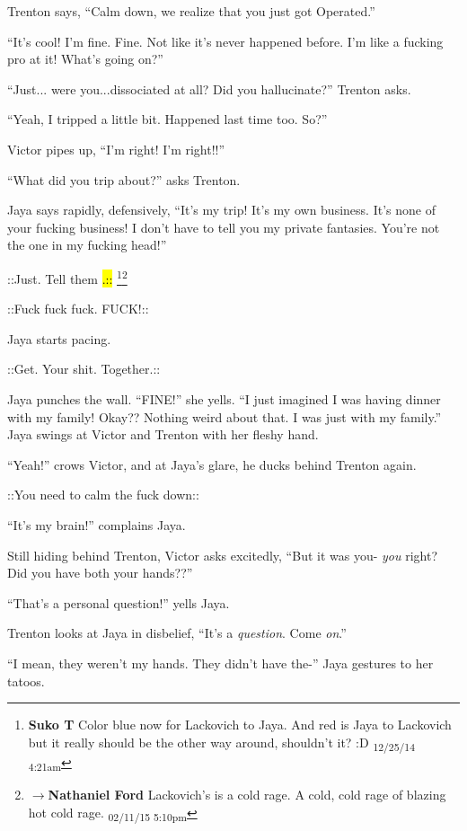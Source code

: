 Trenton says, ``Calm down, we realize that you just got Operated.''

``It's cool!  I'm fine.  Fine.  Not like it's never happened before.  I'm like a fucking pro at it!  What's going on?''

``Just... were you...dissociated at all?  Did you hallucinate?'' Trenton asks.

``Yeah, I tripped a little bit. Happened last time too.  So?''

Victor pipes up, ``I'm right!  I'm right!!''

``What did you trip about?'' asks Trenton.

Jaya says rapidly, defensively, ``It's my trip!  It's my own business.  It's none of your fucking business!  I don't have to tell you my private fantasies. You're not the one in my fucking head!''

 {\color[RGB]{74,134,232}::Just.  Tell them}  {\color[RGB]{74,134,232}\hl{.::}} \footnote{\textbf{Suko T }Color blue now for Lackovich to Jaya.  And red is Jaya to Lackovich but it really should be the other way around, shouldn't it? :D \textsubscript{12/25/14 4:21am}}\footnote{$\rightarrow$\textbf{Nathaniel Ford }Lackovich's is a cold rage. A cold, cold rage of blazing hot cold rage. \textsubscript{02/11/15 5:10pm}}

 {\color[RGB]{255,0,0}::Fuck fuck fuck.  FUCK!::} 

Jaya starts pacing.

 {\color[RGB]{74,134,232}::Get. Your shit. Together.::} 

Jaya punches the wall.  ``FINE!'' she yells. ``I just imagined I was having dinner with my family!  Okay??  Nothing weird about that.  I was just with my family.''  Jaya swings at Victor and Trenton with her fleshy hand.

``Yeah!'' crows Victor, and at Jaya's glare, he ducks behind Trenton again.

 {\color[RGB]{74,134,232}::You need to calm the fuck down::} 

``It's my brain!'' complains Jaya.

Still hiding behind Trenton, Victor asks excitedly, ``But it was you- \textit{you} right? Did you have both your hands??''

``That's a personal question!'' yells Jaya.

Trenton looks at Jaya in disbelief, ``It's a \textit{question}.  Come \textit{on}.''

``I mean, they weren't my hands.  They didn't have the-'' Jaya gestures to her tatoos.

